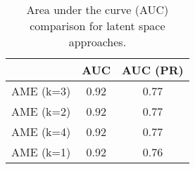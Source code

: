 \begin{table}[ht]
\centering
\begingroup\normalsize
\begin{tabular}{lcc}
  & AUC & AUC (PR) \\ 
  \hline
\hline
AME (k=3) & 0.92 & 0.77 \\ 
  AME (k=2) & 0.92 & 0.77 \\ 
  AME (k=4) & 0.92 & 0.77 \\ 
  AME (k=1) & 0.92 & 0.76 \\ 
  \end{tabular}
\endgroup
\caption{Area under the curve (AUC) comparison for latent space approaches.} 
\label{tab:aucTable_latSpace}
\end{table}
